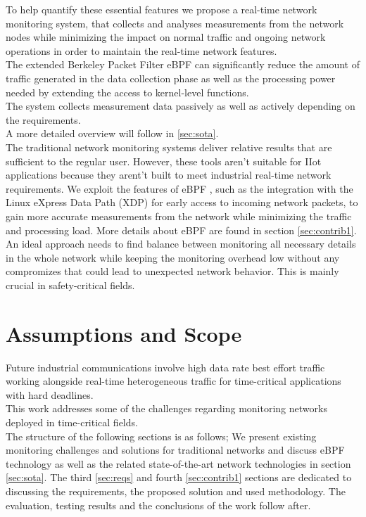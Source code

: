To help quantify these essential features we propose a real-time network monitoring system, that collects and analyses measurements from the network nodes
while minimizing the impact on normal traffic and ongoing network operations in order to maintain the real-time network features.\\
The extended Berkeley Packet Filter eBPF can significantly reduce the amount of traffic generated in the data collection phase
as well as the processing power needed by extending the access to kernel-level functions.\\
The system collects measurement data passively as well as actively depending on the requirements.\\
A more detailed overview will follow in \ref{sec:sota}.\\

The traditional network monitoring systems deliver relative results that are sufficient to the regular user.
However, these tools aren't suitable for IIot applications because they arent't built to meet industrial real-time network requirements.
We exploit the features of eBPF \cite{8850758}, such as the integration with the Linux eXpress Data Path (XDP) for early access to incoming network packets,
to gain more accurate measurements from the network while minimizing the traffic and processing load. More details about eBPF are found in section \ref{sec:contrib1}.\\
An ideal approach needs to find balance between monitoring all necessary details in the whole network while keeping the monitoring
overhead low without any compromizes that could lead to unexpected network behavior. This is mainly crucial in safety-critical fields.

\section{Assumptions and Scope}
Future industrial communications involve high data rate best effort traffic working alongside real-time heterogeneous traffic
for time-critical applications with hard deadlines.\\
This work addresses some of the challenges regarding monitoring networks deployed in time-critical fields.\\
The structure of the following sections is as follows; We present existing monitoring challenges and solutions for traditional networks
and discuss eBPF technology as well as the related state-of-the-art network technologies in section \ref{sec:sota}.
The third \ref{sec:reqs} and fourth \ref{sec:contrib1} sections are dedicated to discussing the requirements, the proposed
solution and used methodology. The evaluation, testing results and the conclusions of the work follow after.\\
